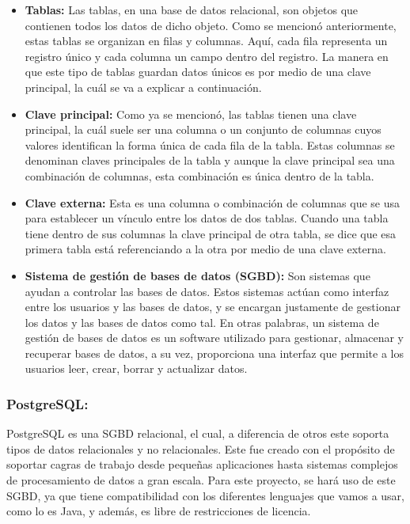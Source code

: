 \begin{itemize}
    \item \textbf{Tablas:} Las tablas, en una base de datos relacional, son objetos que contienen todos los datos de dicho objeto. Como se mencionó anteriormente, estas tablas se organizan en filas y columnas. Aquí, cada fila representa un registro único y cada columna un campo dentro del registro. La manera en que este tipo de tablas guardan datos únicos es por medio de una clave principal, la cuál se va a explicar a continuación. \cite{CitaAJ10}
    \item \textbf{Clave principal:} Como ya se mencionó, las tablas tienen una clave principal, la cuál suele ser una columna o un conjunto de columnas cuyos valores identifican la forma única de cada fila de la tabla. Estas columnas se denominan claves principales de la tabla y aunque la clave principal sea una combinación de columnas, esta combinación es única dentro de la tabla. \cite{CitaAJ11}
    \item \textbf{Clave externa:} Esta es una columna o combinación de columnas que se usa para establecer un vínculo entre los datos de dos tablas. Cuando una tabla tiene dentro de sus columnas la clave principal de otra tabla, se dice que esa primera tabla está referenciando a la otra por medio de una clave externa. \cite{CitaAJ12}
    \item \textbf{Sistema de gestión de bases de datos (SGBD):} Son sistemas que ayudan a controlar las bases de datos. Estos sistemas actúan como interfaz entre los usuarios y las bases de datos, y se encargan justamente de gestionar los datos y las bases de datos como tal. En otras palabras, un sistema de gestión de bases de datos es un software utilizado para gestionar, almacenar y recuperar bases de datos, a su vez, proporciona una interfaz que permite a los usuarios leer, crear, borrar y actualizar datos. \cite{CitaAJ06}
\end{itemize}

\subsubsection{PostgreSQL:}
PostgreSQL es una SGBD relacional, el cual, a diferencia de otros este soporta tipos de datos relacionales y no relacionales. Este fue creado con el propósito de soportar cagras de trabajo desde pequeñas aplicaciones hasta sistemas complejos de procesamiento de datos a gran escala. 
Para este proyecto, se hará uso de este SGBD, ya que tiene compatibilidad con los diferentes lenguajes que vamos a usar, como lo es Java, y además, es libre de restricciones de licencia. \cite{CitaAJ05}

